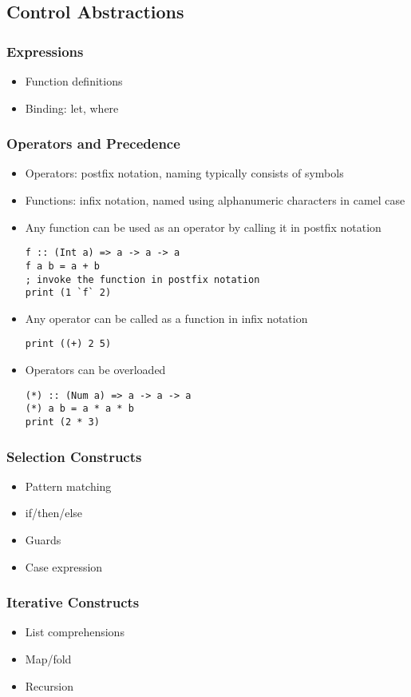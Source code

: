 \documentclass[titlepage,12pt]{article}
\newcommand{\bi}{\begin{itemize}}
\newcommand{\ei}{\end{itemize}}
\begin{document}
\subsection{Control Abstractions}
\subsubsection{Expressions}
\bi
    \item Function definitions
    \item Binding: let, where
\ei

\subsubsection{Operators and Precedence}
\bi
    \item Operators: postfix notation, naming typically consists of symbols
    \item Functions: infix notation, named using alphanumeric characters in camel case
    \item Any function can be used as an operator by calling it in postfix notation
\begin{verbatim}
f :: (Int a) => a -> a -> a
f a b = a + b
; invoke the function in postfix notation
print (1 `f` 2)
\end{verbatim}
    \item Any operator can be called as a function in infix notation
\begin{verbatim}
print ((+) 2 5)
\end{verbatim}
    \item Operators can be overloaded
\begin{verbatim}
(*) :: (Num a) => a -> a -> a
(*) a b = a * a * b
print (2 * 3)
\end{verbatim}
\ei

\subsubsection{Selection Constructs}
\bi
    \item Pattern matching
    \item if/then/else
    \item Guards
    \item Case expression
\ei

\subsubsection{Iterative Constructs}
\bi
    \item List comprehensions
    \item Map/fold
    \item Recursion
\ei
\end{document}
